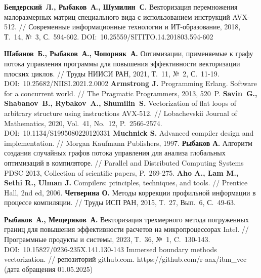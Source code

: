 \begin{thebibliography}{99}
%
\textbf{Бендерский~Л., Рыбаков~А., Шумилин~С.} Векторизация перемножения малоразмерных матриц специального вида с использованием инструкций AVX-512. // Современные информационные технологии и ИТ-образование, 2018, Т.~14, №~3, С.~594-602. DOI:~10.25559/SITITO.14.201803.594-602
%



%
\textbf{Шабанов~Б., Рыбаков~А., Чопорняк~А.} Оптимизации, применяемые к графу потока управления программы для повышения эффективности векторизации плоских циклов. // Труды НИИСИ РАН, 2021, Т.~11, №~2, С.~11-19. DOI:~10.25682/NIISI.2021.2.0002
%
\textbf{Armstrong J.} Programming Erlang. Software for a concurrent world. // The Pragmatic Programmers, 2013, 520~P.
%
\textbf{Savin~G., Shabanov~B., Rybakov~A., Shumilin~S.} Vectorization of flat loops of arbitrary structure using instructions AVX-512. // Lobachevskii Journal of Mathematics, 2020, Vol.~41, No.~12, P.~2566-2574. DOI:~10.1134/S1995080220120331
%
\textbf{Muchnick S.} Advanced compiler design and implementation. // Morgan Kaufmann Publishers, 1997.
%
\textbf{Рыбаков А.} Алгоритм создания случайных графов потока управления для анализа глобальных оптимизаций в компиляторе. // Parallel and Distributed Computing Systems PDSC 2013, Collection of scientific papers, P.~269-275.
%
\textbf{Aho A., Lam M., Sethi R., Ulman J.} Compilers: principles, techniques, and tools. // Prentice Hall, 2nd ed, 2006.
%
\textbf{Четверина О.} Методы коррекции профильной информации в процессе компиляции. // Труды ИСП РАН, 2015, Т.~27, Вып.~6, С.~49-63.
%



%
\textbf{Рыбаков~А., Мещеряков~А.} Векторизация трехмерного метода погруженных границ для повышения эффективности расчетов на микропроцессорах Intel. // Программные продукты и системы, 2023, Т.~36, №~1, C.~130-143. DOI:~10.15827/0236-235X.141.130-143
%
Immersed boundary methods vectorization. // репозиторий github.com. https://github.com/r-aax/ibm\_vec (дата обращения 01.05.2025)
%




\end{thebibliography}
